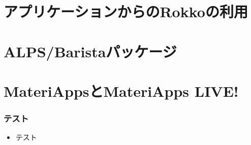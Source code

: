 \section{アプリケーションからのRokkoの利用}
\section{ALPS/Baristaパッケージ}
\section{MateriAppsとMateriApps LIVE!}

\begin{frame}
  \frametitle{テスト}
  \begin{itemize}
  \item テスト
  \end{itemize}
\end{frame}


